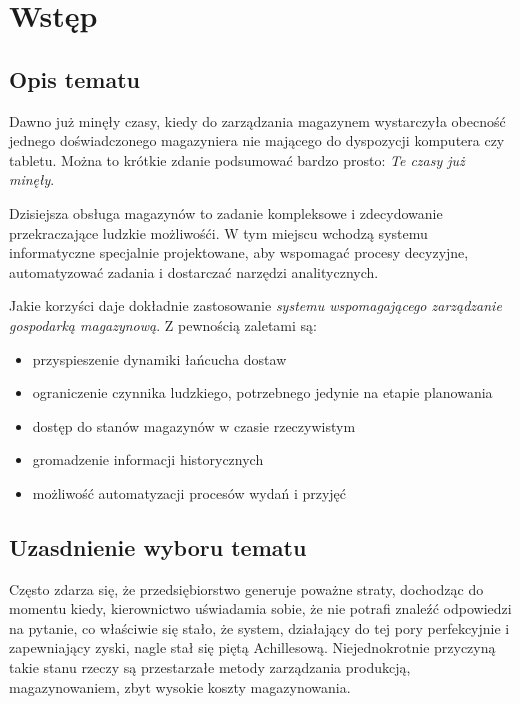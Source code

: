 \chapter{Wstęp}
\label{c1:c1}

\section{Opis tematu}

	\hspace{10pt} Dawno już minęły czasy, kiedy do zarządzania magazynem wystarczyła obecność jednego
	doświadczonego magazyniera nie mającego do dyspozycji komputera czy tabletu. Można
	to krótkie zdanie podsumować bardzo prosto: \textit{Te czasy już minęły}. 
	
	Dzisiejsza obsługa magazynów to zadanie kompleksowe i zdecydowanie przekraczające
	ludzkie możliwośći. W tym miejscu wchodzą systemu informatyczne specjalnie projektowane, 
	aby wspomagać procesy decyzyjne, automatyzować zadania i dostarczać narzędzi analitycznych.
	
	Jakie korzyści daje dokładnie zastosowanie \emph{systemu wspomagającego zarządzanie gospodarką magazynową}.
	Z pewnością zaletami są:
	\begin{itemize}
		\item przyspieszenie dynamiki łańcucha dostaw
		\item ograniczenie czynnika ludzkiego, potrzebnego jedynie na etapie planowania
		\item dostęp do stanów magazynów w czasie rzeczywistym
		\item gromadzenie informacji historycznych
		\item możliwość automatyzacji procesów wydań i przyjęć
	\end{itemize}

\section{Uzasdnienie wyboru tematu}

	\hspace{10pt} Często zdarza się, że przedsiębiorstwo generuje poważne straty, dochodząc do momentu
	kiedy, kierownictwo uświadamia sobie, że nie potrafi znaleźć odpowiedzi na pytanie, co właściwie
	się stało, że system, działający do tej pory perfekcyjnie i zapewniający zyski, nagle stał się
	piętą Achillesową. Niejednokrotnie przyczyną takie stanu rzeczy są przestarzałe metody zarządzania
	produkcją, magazynowaniem, zbyt wysokie koszty magazynowania. 
	
